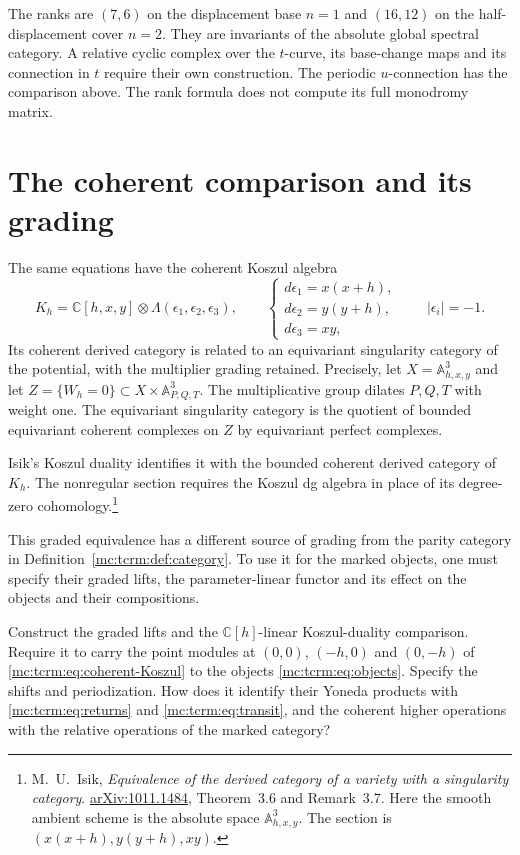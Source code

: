 The ranks are $(7,6)$ on the displacement base $n=1$
and $(16,12)$ on the half-displacement cover $n=2$.
They are invariants of the absolute global spectral
category. A relative cyclic complex over the $t$-curve,
its base-change maps and its connection in $t$ require
their own construction. The periodic $u$-connection has
the comparison above. The rank formula does not compute
its full monodromy matrix.

\section{The coherent comparison and its grading}

The same equations have the coherent Koszul algebra
\begin{equation}\label{mc:tcrm:eq:coherent-Koszul}
 K_h=\mathbb C[h,x,y]\otimes\Lambda(\epsilon_1,\epsilon_2,\epsilon_3),
 \qquad
 \begin{cases}
 d\epsilon_1=x(x+h),\\
 d\epsilon_2=y(y+h),\\
 d\epsilon_3=xy,
 \end{cases}
 \qquad |\epsilon_i|=-1.
\end{equation}
Its coherent derived category is related to an
equivariant singularity category of the potential,
with the multiplier grading retained.
Precisely, let $X=\mathbb A^3_{h,x,y}$ and let
$Z=\{W_h=0\}\subset X\times\mathbb A^3_{P,Q,T}$.
The multiplicative group dilates $P,Q,T$ with
weight one. The equivariant singularity category
is the quotient of bounded equivariant coherent
complexes on $Z$ by equivariant perfect complexes.

Isik's Koszul duality identifies it with the bounded
coherent derived category of $K_h$. The nonregular
section requires the Koszul dg algebra in place of
its degree-zero cohomology.\footnote{M.~U.~Isik,
\emph{Equivalence of the derived category of a variety
with a singularity category}.
\href{https://arxiv.org/abs/1011.1484}{arXiv:1011.1484},
Theorem~3.6 and Remark~3.7. Here the smooth ambient
scheme is the absolute space $\mathbb A^3_{h,x,y}$.
The section is $(x(x+h),y(y+h),xy)$.}

This graded equivalence has a different source of
grading from the parity category in
Definition~\ref{mc:tcrm:def:category}. To use it for
the marked objects, one must specify their graded
lifts, the parameter-linear functor and its effect
on the objects and their compositions.

\begin{question}\label{mc:tcrm:qn:coherent-comparison}
Construct the graded lifts and the $\mathbb C[h]$-linear
Koszul-duality comparison.
Require it to carry the point modules at $(0,0)$, $(-h,0)$
and $(0,-h)$ of \eqref{mc:tcrm:eq:coherent-Koszul} to the
objects \eqref{mc:tcrm:eq:objects}.
Specify the shifts and periodization. How does it identify their
Yoneda products with \eqref{mc:tcrm:eq:returns} and
\eqref{mc:tcrm:eq:transit}, and the coherent higher
operations with the relative operations of the
marked category?
\end{question}

